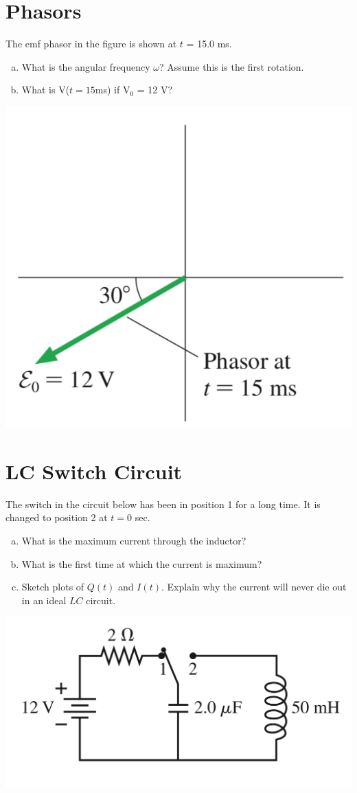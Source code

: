 \documentclass[12pt]{article}
\begin{document}
\vspace{2.5in}
\section{Phasors}

The emf phasor in the figure is shown at $t$ = 15.0 ms. 

\begin{enumerate}[(a)]
\item What is the angular frequency $\omega$? Assume this is the first rotation.
\item What is V($t=15$ms) if V$_0$ = 12 V?
\end{enumerate}
\begin{center}
	\includegraphics[width=.5\linewidth]{Final-fig2}
\end{center}


\newpage
\section{LC Switch Circuit}

The switch in the circuit below has been in position 1 for a long time. It is changed to position 2 at $t=0$ sec.

\begin{enumerate}[(a)]
	\item What is the maximum current through the inductor?
	\item What is the first time at which the current is maximum?
	\item Sketch plots of $Q(t)$ and $I(t)$. Explain why the current will never die out in an ideal $LC$ circuit. 
\end{enumerate}

\begin{center}
	\includegraphics[width=.7\linewidth]{Final-fig3}
\end{center}
\end{document}
